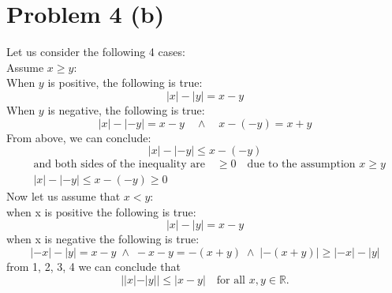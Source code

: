 \documentclass{article}
\begin{document}
\section*{Problem 4 (b)}
Let us consider the following 4 cases: \\
Assume \(x \geq y\):\\
When \(y\) is positive, the following is true:
\[
|x| - |y| = x - y \tag{1}
\]
When \(y\) is negative, the following is true:
\[
|x| - |-y| = x - y \quad \land \quad x - (-y) = x + y
\]
From above, we can conclude:
\[
|x| - |-y| \leq x - (-y)
\]
\begin{align}
&\text{and both sides of the inequality are} \quad \geq 0 \quad \text{due to the assumption } x \geq y \tag{2} \\
&|x| - |-y| \leq x - (-y) \geq 0 \tag{2}
\end{align}
Now let us assume that \(x < y\):\\
when x is positive the following is true:\\
\[
|x| - |y| = x - y \tag{3}
\]
when x is negative the following is true:\\
\[
   |-x| - |y| = x - y \; \land \; -x-y = -(x+y) \; \land \; |-(x+y)| \geq |-x| - |y| \tag{4}
\]
from 1, 2, 3, 4 we can conclude that 
\[
||x| - |y|| \leq |x - y| \quad \text{for all } x, y \in \mathbb{R}.
\] 
\end{document}
